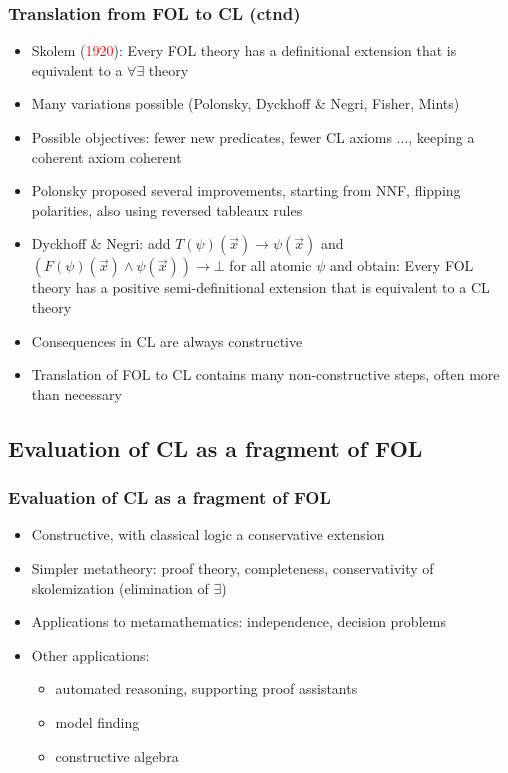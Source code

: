 \documentclass[handout,11pt]{beamer}
\newcommand{\red}[1]{\textcolor{red}{#1}}
\begin{document}
\begin{frame}
\frametitle{Translation from FOL to CL (ctnd)}
 \begin{itemize}[<+->]
   \item Skolem (\red{1920}): Every FOL theory has a definitional 
   extension that is equivalent to a $\forall\exists$ theory
   \item Many variations possible (Polonsky, Dyckhoff \& Negri, Fisher, Mints)
   \item Possible objectives: fewer new predicates, fewer CL axioms ...,
   keeping a coherent axiom coherent
   \item Polonsky proposed several improvements, starting from NNF,
   flipping polarities, also using reversed tableaux rules
   \item Dyckhoff \& Negri: add $T(\psi)(\vec{x}) \to \psi(\vec{x})$ 
   and $(F(\psi)(\vec{x})\wedge \psi(\vec{x})) \to \bot$
   for all atomic $\psi$ and obtain:
   Every FOL theory has a positive semi-definitional extension 
   that is equivalent to a CL theory
   \item Consequences in CL are always constructive
   \item Translation of FOL to CL contains many non-constructive steps,
   often more than necessary
 \end{itemize}
\end{frame}

\subsection{Evaluation of CL as a fragment of FOL}

\begin{frame}
\frametitle{Evaluation of CL as a fragment of FOL}
 \begin{itemize}[<+->]   %
  \item Constructive, with classical logic a conservative extension
  \item Simpler metatheory: proof theory, completeness, 
    conservativity of skolemization (elimination of $\exists$)
  \item Applications to metamathematics: independence, decision problems
  \item Other applications:
   \begin{itemize}[<+->]   %
    \item automated reasoning, supporting proof assistants 
    \item model finding
    \item constructive algebra
   \end{itemize}
 \end{itemize}
\end{frame}
\end{document}
